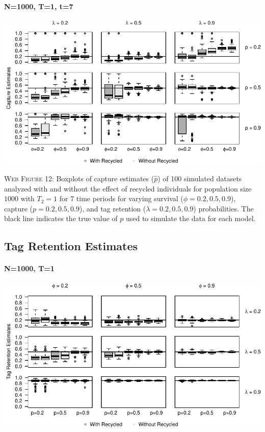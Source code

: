 \documentclass[]{article}
\let\oldparagraph\paragraph
\renewcommand{\paragraph}[1]{\oldparagraph{#1}\mbox{}}
\begin{document}
\paragraph{N=1000, T=1, t=7}\label{n1000-t1-t7-1}

\includegraphics{Appendix_BW_files/figure-latex/figure12_capture_GJSTL6-1.pdf}

\textsc{Web Figure 12:} Boxplots of capture estimates (\(\hat{p}\)) of
100 simulated datasets analyzed with and without the effect of recycled
individuals for population size \(1000\) with \(T_2=1\) for 7 time
periods for varying survival (\(\phi=0.2,0.5,0.9\)), capture
(\(p=0.2,0.5,0.9\)), and tag retention (\(\lambda=0.2,0.5,0.9\))
probabilities. The black line indicates the true value of \(p\) used to
simulate the data for each model.

\newpage

\subsection{Tag Retention Estimates}\label{tag-retention-estimates}

\paragraph{N=1000, T=1}\label{n1000-t1-2}

\includegraphics{Appendix_BW_files/figure-latex/figure13_tagretention_GJSTL1-1.pdf}
\end{document}
